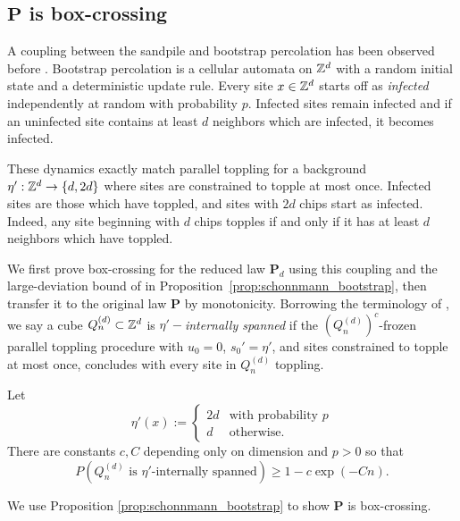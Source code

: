 \documentclass[12pt]{amsart}
\begin{document}
\subsection{\texorpdfstring{$\mathbf{P}$}{P} is box-crossing}
A coupling between the sandpile and bootstrap percolation has been observed before  \cite{fey2010growth}. 
Bootstrap percolation is a cellular automata on $\mathbb{Z}^d$ with a random initial state and a deterministic update rule. 
Every site $x \in \mathbb{Z}^d$ starts off as {\it infected} independently at random with probability $p$. 
Infected sites remain infected and if an uninfected site contains at least $d$ neighbors which
are infected, it becomes infected.

These dynamics exactly match parallel toppling for a background $\eta':\mathbb{Z}^d \to \{d, 2 d\}$
where sites are constrained to topple at most once.
Infected sites are those which have toppled, and sites with $2 d$ chips start as infected. Indeed, any 
site beginning with $d$ chips topples if and only if it has at least $d$ neighbors which have toppled.


We first prove box-crossing for the reduced law $\mathbf P_d$ using this coupling and the large-deviation bound of \cite{schonmann1992behavior} in Proposition~\ref{prop:schonnmann_bootstrap}, then transfer it to the original law $\mathbf P$ by monotonicity. Borrowing the terminology of \cite{schonmann1992behavior}, we say a cube $Q_n^{(d)} \subset \mathbb{Z}^d$ is $\eta'-${\it internally spanned} if the $(Q_n^{(d)})^c$-frozen parallel toppling procedure with $u_0 = 0$, $s_0' = \eta'$, and sites constrained to topple at most once, concludes with every site in $Q_n^{(d)}$ toppling.




\begin{prop} \label{prop:schonnmann_bootstrap}
	Let
	\[
	\eta'(x) := \begin{cases} 2 d &\mbox{with probability $p$} \\
	d &\mbox{otherwise.}
	\end{cases}
	\]
	There are constants $c,C$ depending only on dimension and $p > 0$
	so that 
	\begin{equation}
	P(\mbox{$Q_n^{(d)}$ is $\eta'$-internally spanned}) \geq 1 -  c \exp(-C n).
	\end{equation}
\end{prop}


We use Proposition \ref{prop:schonnmann_bootstrap} to show $\mathbf{P}$ is box-crossing. 
\end{document}
